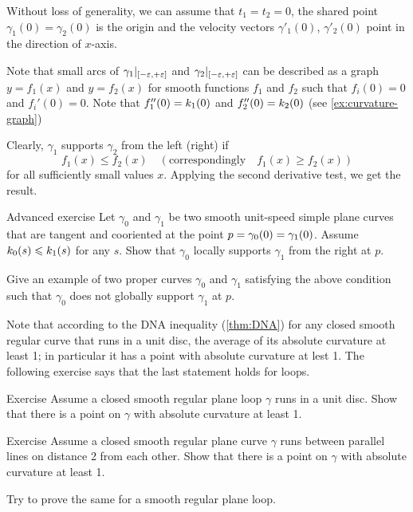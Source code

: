  Without loss of generality, we can assume that $t_1=t_2=0$, the shared point $\gamma_1(0)=\gamma_2(0)$ is the origin and the velocity vectors $\gamma'_1(0)$, $\gamma'_2(0)$ point in the direction of $x$-axis.

Note that small arcs of $\gamma_1|_{[-\varepsilon,+\varepsilon]}$ and  $\gamma_2|_{[-\varepsilon,+\varepsilon]}$ can be described as a graph 
$y=f_1(x)$ and $y=f_2(x)$ for smooth functions $f_1$ and $f_2$ such that $f_i(0)=0$ and $f_i'(0)=0$.
Note that $f_1''(0)=k_1(0)$ and $f_2''(0)=k_2(0)$ (see \ref{ex:curvature-graph})

Clearly, $\gamma_1$ supports $\gamma_2$ from the left (right) if 
\[f_1(x)\le f_2(x)\quad(\text{correspondingly}\quad f_1(x)\ge f_2(x))\]
for all sufficiently small values $x$.
Applying the second derivative test, we get the result.
\qeds


\begin{thm}{Advanced exercise}\label{ex:support}
Let $\gamma_0$ and $\gamma_1$ be two smooth unit-speed simple plane curves that are tangent and cooriented at the point $p\z=\gamma_0(0)=\gamma_1(0)$.
Assume $k_0(s)\leqslant k_1(s)$ for any $s$.
Show that $\gamma_0$ locally supports $\gamma_1$ from the right at $p$.

Give an example of two proper curves $\gamma_0$ and $\gamma_1$ satisfying the above condition such that $\gamma_0$ does not globally support $\gamma_1$ at $p$.
\end{thm}

Note that according to the DNA inequality (\ref{thm:DNA}) for any closed smooth regular curve that runs in a unit disc, the average of its absolute curvature at least 1; in particular it has a point with absolute curvature at lest 1.
The following exercise says that the last statement holds for loops.

\begin{thm}{Exercise}\label{ex:in-circle}
Assume a closed smooth regular plane loop $\gamma$ runs in a unit disc.
Show that there is a point on $\gamma$ with absolute curvature at least 1.
\end{thm}


\begin{thm}{Exercise}\label{ex:between-parallels-1}
Assume a closed smooth regular plane curve $\gamma$ runs between parallel lines on distance 2 from each other.
Show that there is a point on $\gamma$ with absolute curvature at least 1.

Try to prove the same for a smooth regular plane loop.
\end{thm}


